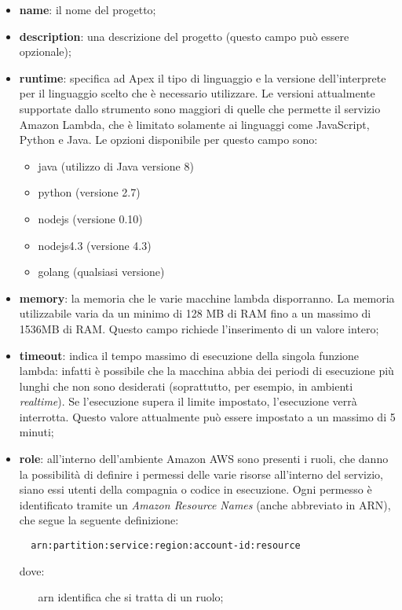\begin{itemize}
  \item \textbf{name}: il nome del progetto;
  \item \textbf{description}: una descrizione del progetto (questo campo può
essere opzionale);
  \item \textbf{runtime}: specifica ad Apex il tipo di linguaggio e la versione
dell'interprete per il linguaggio scelto che è necessario utilizzare. Le
versioni attualmente supportate dallo strumento sono maggiori di quelle che
permette il servizio Amazon Lambda, che è limitato solamente ai linguaggi come
JavaScript, Python e Java. Le opzioni disponibile per questo campo sono:
  \begin{itemize}
    \item java (utilizzo di Java versione 8)
    \item python (versione 2.7)
    \item nodejs (versione 0.10)
    \item nodejs4.3 (versione 4.3)
    \item golang (qualsiasi versione)
  \end{itemize}

  \item \textbf{memory}: la memoria che le varie macchine lambda disporranno.
La memoria utilizzabile varia da un minimo di 128 MB di RAM fino a un massimo
di 1536MB di RAM. Questo campo richiede l'inserimento di un valore intero;

  \item \textbf{timeout}: indica il tempo massimo di esecuzione della singola
funzione lambda: infatti è possibile che la macchina abbia dei periodi di
esecuzione più lunghi che non sono desiderati (soprattutto, per esempio, in
ambienti \textit{realtime}). Se l'esecuzione supera il limite impostato,
l'esecuzione verrà interrotta. Questo valore attualmente può essere impostato a
un massimo di 5 minuti;

  \item \textbf{role}: all'interno dell'ambiente Amazon AWS sono presenti i
ruoli, che danno la possibilità di definire i permessi delle varie risorse
all'interno del servizio, siano essi utenti della compagnia o codice in
esecuzione. Ogni permesso è identificato tramite un \textit{Amazon Resource
Names} (anche abbreviato in ARN), che segue la seguente definizione:
\begin{verbatim}
  arn:partition:service:region:account-id:resource
\end{verbatim}
dove:
  \begin{itemize}
    \item[arn] identifica che si tratta di un ruolo;


\end{itemize}
\end{itemize}
